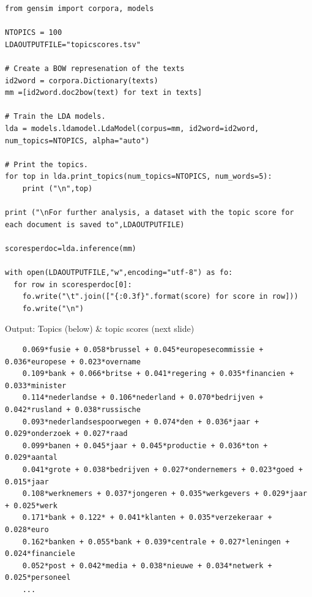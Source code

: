 \documentclass{beamer}
\begin{document}
\begin{frame}
\begin{lstlisting}
from gensim import corpora, models

NTOPICS = 100
LDAOUTPUTFILE="topicscores.tsv"

# Create a BOW represenation of the texts
id2word = corpora.Dictionary(texts)
mm =[id2word.doc2bow(text) for text in texts]

# Train the LDA models.
lda = models.ldamodel.LdaModel(corpus=mm, id2word=id2word, num_topics=NTOPICS, alpha="auto")

# Print the topics.
for top in lda.print_topics(num_topics=NTOPICS, num_words=5):
    print ("\n",top)

print ("\nFor further analysis, a dataset with the topic score for each document is saved to",LDAOUTPUTFILE)

scoresperdoc=lda.inference(mm)

with open(LDAOUTPUTFILE,"w",encoding="utf-8") as fo:
  for row in scoresperdoc[0]:
    fo.write("\t".join(["{:0.3f}".format(score) for score in row]))
    fo.write("\n")
\end{lstlisting}

\end{frame}




\begin{frame}[fragile]{Output: Topics (below) \& topic scores (next slide)}
	\begin{lstlisting}
	0.069*fusie + 0.058*brussel + 0.045*europesecommissie + 0.036*europese + 0.023*overname
	0.109*bank + 0.066*britse + 0.041*regering + 0.035*financien + 0.033*minister
	0.114*nederlandse + 0.106*nederland + 0.070*bedrijven + 0.042*rusland + 0.038*russische
	0.093*nederlandsespoorwegen + 0.074*den + 0.036*jaar + 0.029*onderzoek + 0.027*raad
	0.099*banen + 0.045*jaar + 0.045*productie + 0.036*ton + 0.029*aantal
	0.041*grote + 0.038*bedrijven + 0.027*ondernemers + 0.023*goed + 0.015*jaar
	0.108*werknemers + 0.037*jongeren + 0.035*werkgevers + 0.029*jaar + 0.025*werk
	0.171*bank + 0.122* + 0.041*klanten + 0.035*verzekeraar + 0.028*euro
	0.162*banken + 0.055*bank + 0.039*centrale + 0.027*leningen + 0.024*financiele
	0.052*post + 0.042*media + 0.038*nieuwe + 0.034*netwerk + 0.025*personeel
	...
	\end{lstlisting}
\end{frame}
\end{document}
